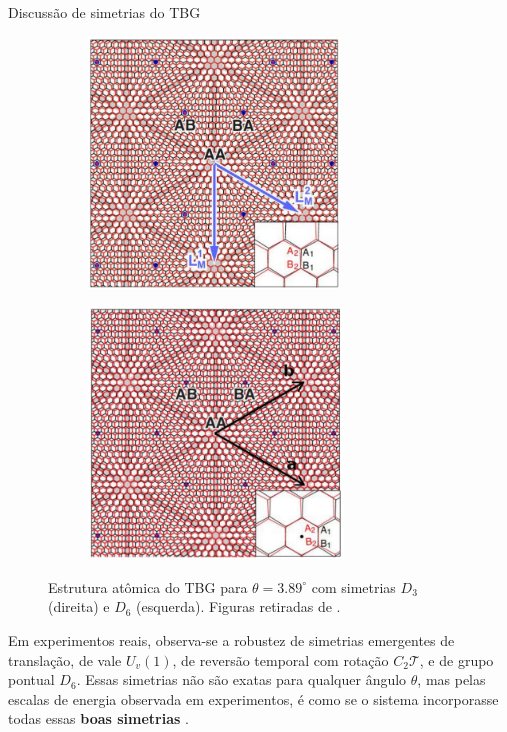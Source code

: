 \documentclass[8pt,aspectratio=169,xcolor={table,dvipsnames,usenames}]{beamer}
\begin{document}
\begin{frame}{Discussão de simetrias do TBG}
\begin{figure}[H]
\centering
\begin{subfigure}{.48\textwidth}
  \centering
  \includegraphics[height=18em]{fig/AA_AB-D3.png}
  \label{fig:AA_AB-D3}
\end{subfigure}%
\quad
\begin{subfigure}{.48\textwidth}
  \centering
  \includegraphics[height=18em]{fig/AA_AB-D6.png}
  \label{fig:AA_AB-D6}
\end{subfigure}
\caption{Estrutura atômica do TBG para $\theta = 3.89^\circ$ com simetrias $D_3$ (direita) e $D_6$ (esquerda). Figuras retiradas de \cite{rennella}.}
\label{fig:AA_AB}
\end{figure}
\vspace{-1em}
Em experimentos reais, observa-se a robustez de simetrias emergentes de translação, de vale $U_v(1)$, de reversão temporal com rotação $C_2 \mathcal{T}$, e de grupo pontual $D_6$. Essas simetrias não são exatas para qualquer ângulo $\theta$, mas pelas escalas de energia observada em experimentos, é como se o sistema incorporasse todas essas \textbf{boas simetrias} \cite{zou}.

\end{frame}

\end{document}
